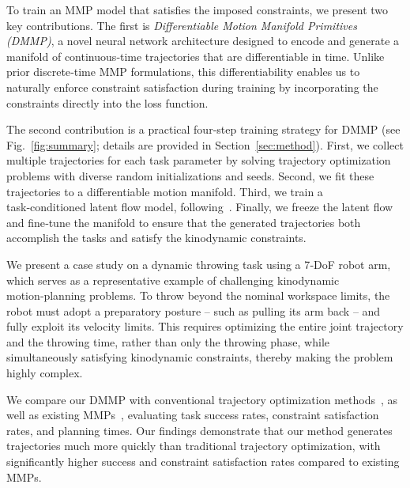 To train an MMP model that satisfies the imposed constraints, we present two key contributions.  
The first is \emph{Differentiable Motion Manifold Primitives (DMMP)}, a novel neural network architecture designed to encode and generate a manifold of continuous‑time trajectories that are differentiable in time.  Unlike prior discrete‑time MMP formulations, this differentiability enables us to naturally enforce constraint satisfaction during training by incorporating the constraints directly into the loss function.

The second contribution is a practical four‑step training strategy for DMMP (see Fig.~\ref{fig:summary}; details are provided in Section~\ref{sec:method}).  
First, we collect multiple trajectories for each task parameter by solving trajectory optimization problems with diverse random initializations and seeds.  
Second, we fit these trajectories to a differentiable motion manifold.  
Third, we train a task‑conditioned latent flow model, following~\cite{lee2025motion}.  
Finally, we freeze the latent flow and fine‑tune the manifold to ensure that the generated trajectories both accomplish the tasks and satisfy the kinodynamic constraints.


We present a case study on a dynamic throwing task using a 7‑DoF robot arm, which serves as a representative example of challenging kinodynamic motion‑planning problems.  
To throw beyond the nominal workspace limits, the robot must adopt a preparatory posture -- such as pulling its arm back -- and fully exploit its velocity limits.  
This requires optimizing the entire joint trajectory and the throwing time, rather than only the throwing phase, while simultaneously satisfying kinodynamic constraints, thereby making the problem highly complex.


We compare our DMMP with conventional trajectory optimization methods~\cite{powell1994direct,kraft1988software,kingma2014adam}, as well as existing MMPs~\cite{lee2023equivariant,lee2025motion}, evaluating task success rates, constraint satisfaction rates, and planning times. Our findings demonstrate that our method generates trajectories much more quickly than traditional trajectory optimization, with significantly higher success and constraint satisfaction rates compared to existing MMPs.